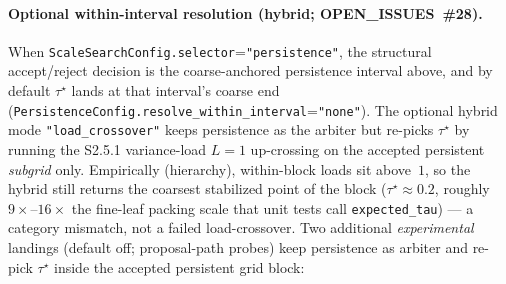 \documentclass[11pt]{article}
\begin{document}
\paragraph{Optional within-interval resolution (hybrid; OPEN\_ISSUES~\#28).}
When \texttt{ScaleSearchConfig.selector}=\texttt{"persistence"}, the structural
accept/reject decision is the coarse-anchored persistence interval above, and by
default $\tau^\star$ lands at that interval's coarse end
(\texttt{PersistenceConfig.resolve\_within\_interval}=\texttt{"none"}).
The optional hybrid mode \texttt{"load\_crossover"} keeps persistence as the
arbiter but re-picks $\tau^\star$ by running the S2.5.1 variance-load $L{=}1$
up-crossing on the accepted persistent \emph{subgrid} only. Empirically
(hierarchy), within-block loads sit above~$1$, so the hybrid still returns the
coarsest stabilized point of the block ($\tau^\star\approx0.2$, roughly $9\times$--$16\times$
the fine-leaf packing scale that unit tests call \texttt{expected\_tau}) --- a
category mismatch, not a failed load-crossover. Two additional
\emph{experimental} landings (default off; proposal-path probes) keep
persistence as arbiter and re-pick $\tau^\star$ inside the accepted persistent
grid block:
\end{document}
